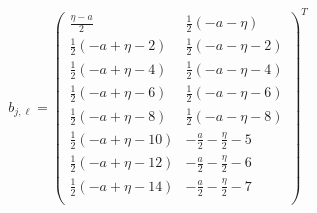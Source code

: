 \documentclass[11pt]{article}
\begin{document}
\begin{align*}
  b_{j,\ell} = 
  \left(
\begin{array}{cc}
 \frac{\eta -a}{2} & \frac{1}{2} (-a-\eta ) \\
 \frac{1}{2} (-a+\eta -2) & \frac{1}{2} (-a-\eta -2) \\
 \frac{1}{2} (-a+\eta -4) & \frac{1}{2} (-a-\eta -4) \\
 \frac{1}{2} (-a+\eta -6) & \frac{1}{2} (-a-\eta -6) \\
 \frac{1}{2} (-a+\eta -8) & \frac{1}{2} (-a-\eta -8) \\
 \frac{1}{2} (-a+\eta -10) & -\frac{a}{2}-\frac{\eta }{2}-5 \\
 \frac{1}{2} (-a+\eta -12) & -\frac{a}{2}-\frac{\eta }{2}-6 \\
 \frac{1}{2} (-a+\eta -14) & -\frac{a}{2}-\frac{\eta }{2}-7 \\
\end{array}
\right)^T 
\end{align*}
\end{document}
